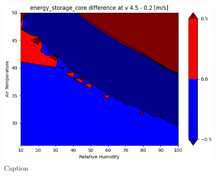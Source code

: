 \begin{figure}
    \centering
    \includegraphics[width=\textwidth]{figures/energy_storage_delta.png}
    \caption{Caption}
    \label{fig:energy_storage_delta}
\end{figure}


